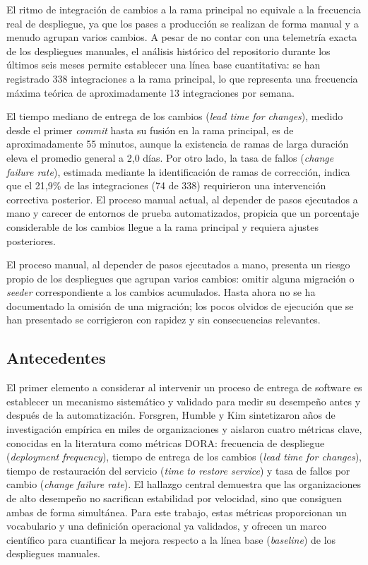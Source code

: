El ritmo de integración de cambios a la rama principal no equivale a la frecuencia real de
despliegue, ya que los pases a producción se realizan de forma manual y a menudo agrupan
varios cambios. A pesar de no contar con una telemetría exacta de los despliegues manuales,
el análisis histórico del repositorio durante los últimos seis meses permite establecer una
línea base cuantitativa: se han registrado 338 integraciones a la rama principal, lo que
representa una frecuencia máxima teórica de aproximadamente 13 integraciones por semana.

El tiempo mediano de entrega de los cambios (\emph{lead time for changes}),
medido desde el primer \emph{commit} hasta su fusión en la rama principal,
es de aproximadamente 55 minutos, aunque la existencia de ramas de larga duración
eleva el promedio general a 2,0 días. Por otro lado, la tasa de fallos
(\emph{change failure rate}), estimada mediante la identificación de ramas de
corrección, indica que el 21,9\% de las integraciones (74 de 338) requirieron una
intervención correctiva posterior. El proceso manual actual, al depender de pasos
ejecutados a mano y carecer de entornos de prueba automatizados, propicia que un porcentaje
considerable de los cambios llegue a la rama principal y requiera ajustes posteriores.

El proceso manual, al depender de pasos ejecutados a mano, presenta un riesgo propio de los
despliegues que agrupan varios cambios: omitir alguna migración o \emph{seeder} correspondiente a los
cambios acumulados. Hasta ahora no se ha documentado la omisión de una migración; los pocos olvidos
de ejecución que se han presentado se corrigieron con rapidez y sin consecuencias relevantes.

\subsection{Antecedentes}
El primer elemento a considerar al intervenir un proceso de entrega de software es establecer un mecanismo
sistemático y validado para medir su desempeño antes y después de la automatización. Forsgren, Humble y Kim
\cite{Forsgren2018} sintetizaron años de investigación empírica en miles de organizaciones y aislaron cuatro
métricas clave, conocidas en la literatura como métricas DORA: frecuencia de despliegue (\emph{deployment frequency}),
tiempo de entrega de los cambios (\emph{lead time for changes}), tiempo de restauración del servicio
(\emph{time to restore service}) y tasa de fallos por cambio (\emph{change failure rate}). El hallazgo
central demuestra que las organizaciones de alto desempeño no sacrifican estabilidad por velocidad, sino
que consiguen ambas de forma simultánea. Para este trabajo, estas métricas proporcionan un vocabulario y una
definición operacional ya validados, y ofrecen un marco científico para cuantificar la mejora respecto a la línea base
(\emph{baseline}) de los despliegues manuales.

